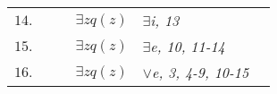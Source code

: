 \documentclass[12pt]{article}
\begin{document}
\begin{table}[H]
\begin{tabular}{*6{l}}
		
		$14.$ &\multicolumn{1}{|c|}{} & & $\exists z q(z)$
		&\textit{$\exists$i, 13} &\multicolumn{1}{|c|}{}\\
		\cline{3-5}
		
		$15.$ &\multicolumn{1}{|c}{} & & $ \exists z q(z)$ &\textit{$\exists$e, 10, 11-14} &\multicolumn{1}{c|}{}\\
		\cline{2-6}
		
		$16.$ &\multicolumn{1}{c}{} & & $\exists z q(z)$ &\textit{$\lor$e,  3, 4-9, 10-15} &\multicolumn{1}{c}{}\\ 

		
	\end{tabular}
\end{table}
\end{document}
